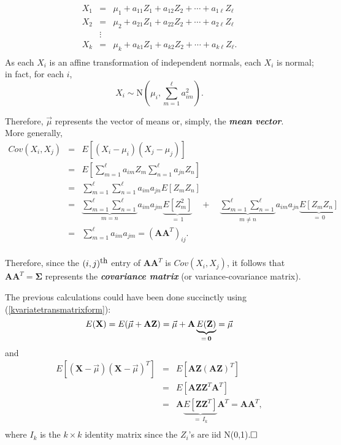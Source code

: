\documentclass[12pt]{article}
\begin{document}
\begin{eqnarray*}
X_1 & = & \mu_1 + a_{11}Z_1 + a_{12}Z_2 + \cdots + a_{1\ell}Z_{\ell}\\
X_2 & = & \mu_2 + a_{21}Z_1 + a_{22}Z_2 + \cdots + a_{2\ell}Z_{\ell}\\
 & \vdots & \\
X_k & = & \mu_k + a_{k1}Z_1 + a_{k2}Z_2 + \cdots + a_{k\ell}Z_{\ell}.\\
\end{eqnarray*}
As each $X_i$ is an affine transformation of independent normals, each $X_i$ is normal; in fact, for each $i$,
$$X_i\sim \mbox{N}(\mu_i, \sum_{m=1}^{\ell}a_{im}^2).$$

\noindent Therefore, $\vec{\mu}$ represents the vector of means or, simply, the {\bf\em mean vector}\label{meanvector}.\\


\noindent More generally,
\begin{eqnarray*}
Cov(X_i,X_j) &=& E[(X_i-\mu_i)(X_j-\mu_j)]\\
&=& E\left[ \sum_{m=1}^{\ell}a_{im}Z_m \sum_{n=1}^{\ell}a_{jn}Z_n\right]\\
&=& \sum_{m=1}^{\ell}\sum_{n=1}^{\ell}a_{im}a_{jn}E\left[Z_m Z_n\right]\\
&=& \underbrace{\sum_{m=1}^{\ell}\sum_{n=1}^{\ell}}_{m=n}a_{im}a_{jm}\underbrace{E\left[Z_m^2 \right]}_{=\,1} \quad + \quad \underbrace{\sum_{m=1}^{\ell}\sum_{n=1}^{\ell}}_{m\ne n}a_{im}a_{jn}\underbrace{E\left[Z_m Z_n\right]}_{=\,0}\\
&=& \sum_{m=1}^{\ell}a_{im}a_{jm}  = (\mathbf{AA}^T)_{ij}.\\
\end{eqnarray*}

\noindent Therefore, since the $(i,j)^{\mbox{\small th}}$ entry of $\mathbf{AA}^T$ is $Cov(X_i,X_j)$, it follows that $\mathbf{AA}^T=\mathbf{\Sigma}$ represents the {\bf \em covariance matrix}\label{covariancematrix} (or variance-covariance matrix).


\newpage

\noindent The previous calculations could have been done succinctly using (\ref{kvariatetransmatrixform}):
$$E(\mathbf{X}) = E(\vec{\mu}+\mathbf{AZ}) = \vec{\mu} + \mathbf{A}\underbrace{E(\mathbf{Z})}_{=\,{\bf 0}} = \vec{\mu}$$
and
\begin{eqnarray*}
E[(\mathbf{X}-\vec{\mu})(\mathbf{X}-\vec{\mu})^T] &=& E[\mathbf{AZ}(\mathbf{AZ})^T]\\
&=& E[\mathbf{AZ}\mathbf{Z}^T\mathbf{A}^T]\\
&=& \mathbf{A}\underbrace{E[\mathbf{ZZ}^T]}_{=\, I_k}\mathbf{A}^T = \mathbf{AA}^T,\\
\end{eqnarray*}
where $I_k$ is the $k\times k$ identity matrix since the $Z_i$'s are iid N(0,1).$\hfill\Box$
\end{document}
